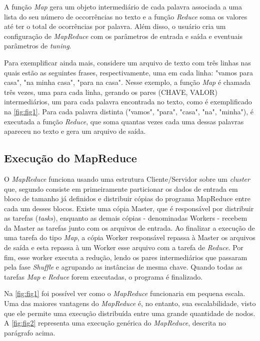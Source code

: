 \newpage
A função \textit{Map} gera um objeto intermediário de cada palavra associada a uma lista do seu número de occorrências no texto e a função \textit{Reduce} soma os valores até ter o total de ocorrências por palavra. Além disso, o usuário cria um configuração de \textit{MapReduce} com os parâmetros de entrada e saída e eventuais parâmetros de \textit{tuning}.

Para exemplificar ainda mais, considere um arquivo de texto com três linhas nas quais estão as seguintes frases, respectivamente, uma em cada linha: "vamos para casa", "na minha casa", "para na casa". Nesse exemplo, a função \textit{Map} é chamada três vezes, uma para cada linha, gerando os pares (CHAVE, VALOR) intermediários, um para cada palavra encontrada no texto, como é exemplificado na \autoref{fig:fig1}. Para cada palavra distinta ("vamos", "para", "casa", "na", "minha"), é executada a função \textit{Reduce}, que soma quantas vezes cada uma dessas palavras apareceu no texto e gera um arquivo de saída.


\subsection{Execução do MapReduce}\label{ssec:execucaomapreduce}

O \textit{MapReduce} funciona usando uma estrutura Cliente/Servidor sobre um \textit{cluster} que, segundo \textcite{MapReduce08} consiste em primeiramente particionar os dados de entrada em bloco de tamanho já definidos e distribuir cópias do programa MapReduce entre cada um desses blocos. Existe uma cópia Master, que é responsável por distribuir as tarefas (\textit{tasks}), enquanto as demais cópias - denominadas Workers - recebem da Master as tarefas junto com os arquivos de entrada. Ao finalizar a execução de uma tarefa do tipo \textit{Map}, a cópia Worker responsável repassa à Master os arquivos de saída e esta repassa à um Worker esse arquivo com a tarefa de \textit{Reduce}. Por fim, esse worker executa a redução, lendo os pares intermediários que passaram pela fase \textit{Shuffle} e agrupando as instâncias de mesma chave. Quando todas as tarefas \textit{Map} e \textit{Reduce} forem executadas, o programa é finalizado.

Na \autoref{fig:fig1} foi possível ver como o \textit{MapReduce} funcionaria em pequena escala. Uma das maiores vantagens do \textit{MapReduce} é, no entanto, sua escalabilidade, visto que ele permite uma execução distribuída entre uma grande quantidade de nodos. A \autoref{fig:fig2}  representa uma execução genérica do \textit{MapReduce}, descrita no parágrafo acima.

